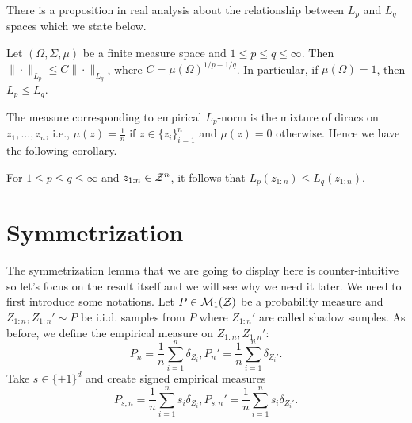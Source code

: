 \documentclass[twoside]{article}
\begin{document}
There is a proposition in real analysis about the relationship between $L_p$ and $L_q$ spaces which we state below.
\begin{proposition}
   Let $(\Omega, \Sigma, \mu)$ be a finite measure space and $1\le p\le q\le \infty$. Then $\|\cdot\|_{L_p}\le C\|\cdot\|_{L_q}$, where $C=\mu(\Omega)^{1/p-1/q}$. In particular, if $\mu(\Omega)=1$, then $L_p\le L_q$.
\end{proposition}
The measure corresponding to empirical $L_p$-norm is the mixture of diracs on $z_1,...,z_n$, i.e., $\mu(z)=\frac{1}{n}$ if $z\in \{z_i\}_{i=1}^n $ and $\mu(z)=0$ otherwise. Hence we have the following corollary.
\begin{corollary}
   For $1\le p\le q\le \infty$ and $z_{1:n}\in \mathcal{Z}^n$, it follows that $L_p(z_{1:n})\le L_q(z_{1:n})$.
\end{corollary}

\section{Symmetrization}
The symmetrization lemma that we are going to display here is counter-intuitive so let's focus on the result itself and we will see why we need it later. We need to first introduce some notations. Let $P\in \mathcal{M}_1(\mathcal{Z})$ be a probability measure and $Z_{1:n}, Z_{1:n}'\sim P$ be i.i.d. samples from $P$ where $Z_{1:n}'$ are called shadow samples. 
As before, we define the empirical measure on $Z_{1:n}, Z_{1:n}'$: \[P_n=\frac{1}{n}\sum_{i=1}^n \delta_{Z_i}, P_n'=\frac{1}{n}\sum_{i=1}^n \delta_{Z_i'}.\]
Take $s\in \{\pm 1\}^d$ and create signed empirical measures \[P_{s,n}=\frac{1}{n}\sum_{i=1}^n s_i\delta_{Z_i}, P_{s,n}'=\frac{1}{n}\sum_{i=1}^ns_i\delta_{Z_i'}.\]
\end{document}

